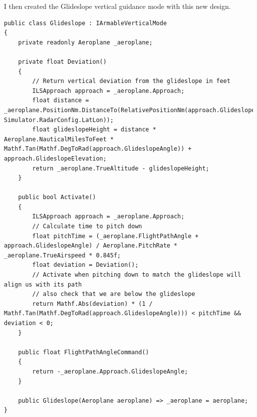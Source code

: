 \documentclass{article}
\begin{document}
I then created the Glideslope vertical guidance mode with this new design.
\lstset{style=csharp}
\begin{lstlisting}[caption=Glideslope vertical guidance mode]
public class Glideslope : IArmableVerticalMode
{
    private readonly Aeroplane _aeroplane;

    private float Deviation()
    {
        // Return vertical deviation from the glideslope in feet
        ILSApproach approach = _aeroplane.Approach;
        float distance = _aeroplane.PositionNm.DistanceTo(RelativePositionNm(approach.GlideslopeLatLon, Simulator.RadarConfig.LatLon));
        float glideslopeHeight = distance * Aeroplane.NauticalMilesToFeet * Mathf.Tan(Mathf.DegToRad(approach.GlideslopeAngle)) + approach.GlideslopeElevation;
        return _aeroplane.TrueAltitude - glideslopeHeight;
    }

    public bool Activate()
    {
        ILSApproach approach = _aeroplane.Approach;
        // Calculate time to pitch down
        float pitchTime = (_aeroplane.FlightPathAngle + approach.GlideslopeAngle) / Aeroplane.PitchRate * _aeroplane.TrueAirspeed * 0.845f;
        float deviation = Deviation();
        // Activate when pitching down to match the glideslope will align us with its path
        // also check that we are below the glideslope
        return Mathf.Abs(deviation) * (1 / Mathf.Tan(Mathf.DegToRad(approach.GlideslopeAngle))) < pitchTime && deviation < 0;
    }

    public float FlightPathAngleCommand()
    {
        return -_aeroplane.Approach.GlideslopeAngle;
    }

    public Glideslope(Aeroplane aeroplane) => _aeroplane = aeroplane;
}
\end{lstlisting}
\end{document}
